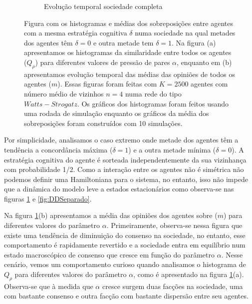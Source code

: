 \begin{figure}
\begin{subfigure}[]{.9\textwidth}
        \caption{Evolução temporal sociedade completa}
    \end{subfigure}
\label{fig:DDCompleto} \caption{Figura com os histogramas e médias dos
sobreposições entre agentes com a mesma estratégia cognitiva $\delta$
numa sociedade na qual metades dos agentes têm $\delta = 0$ e outra metade
tem $\delta =1$. Na figura (a) apresentamos os histogramas da similaridade
entre todos os agentes ($Q_\rho$) para diferentes valores de pressão
de pares $\alpha$, enquanto em (b) apresentamos evolução temporal das
médias das opiniões de todos os agentes ($m$). Essas figuras foram feitas
com $K=2500$ agentes com número médio de vizinhos $n=4$ numa rede do
tipo $Watts-Strogatz$. Os gráficos dos histogramas foram feitos usando uma
rodada de simulação enquanto os gráficos da média dos sobreposições
foram construídos com 10 simulações. }
\end{figure}

Por simplicidade, analisamos o caso extremo onde metade dos agentes têm a
tendência a concordância máxima ($\delta = 1$) e a outra metade mínima
($\delta = 0$). A estratégia cognitiva do agente é sorteada independentemente
da sua vizinhança com probabilidade 1/2.  Como a interação entre os
agentes não é simétrica não podemos definir uma Hamiltoniana para o
sistema, no entanto, isso não impede que a dinâmica do modelo leve a
estados estacionários como observa-se nas figuras \ref{fig:DDCompleto}
e \ref{fig:DDSeparado}.

Na figura \ref{fig:DDCompleto}(b) apresentamos a média das opiniões dos
agentes sobre  ($m$) para diferentes valores do parâmetro
$\alpha$. Primeiramente, observa-se nessa figura que existe uma tendência
de diminuição do consenso na sociedade, no entanto, esse comportamento é
rapidamente revertido e a sociedade entra em equilíbrio num estado macroscópico
de consenso que cresce em função do parâmetro $\alpha$. Nesse cenário,
vemos um comportamento curioso quando analisamos o histograma de $Q_\rho$
para diferentes valores do parâmetro $\alpha$, como é apresentado na figura
\ref{fig:DDCompleto}(a). Observa-se que à medida que $\alpha$ cresce surgem
duas facções na sociedade, uma com bastante consenso e outra facção 
com bastante dispersão entre seu agentes.

